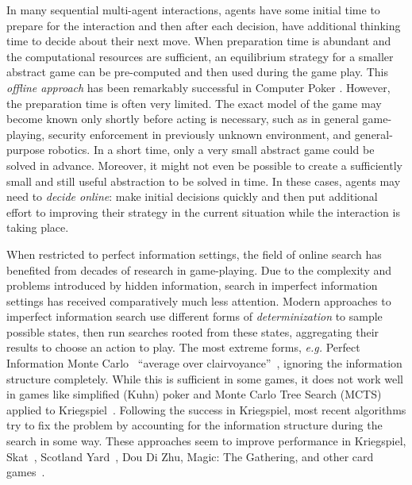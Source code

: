 \documentclass[letterpaper]{article}
\newcommand{\eg}{{\it e.g.}\xspace}
\begin{document}
In many sequential multi-agent interactions, agents have some initial time to prepare for the interaction and then after each decision, have  additional thinking time to decide about their next move. When preparation time is abundant and the computational resources are sufficient, an equilibrium strategy for a smaller abstract game can be pre-computed and then used during the game play. This {\it offline approach} has been remarkably successful in Computer Poker \cite{Johanson07Msc}.
However, the preparation time is often very limited. The exact model of the game may become known only shortly before acting is necessary, such as in general game-playing, security enforcement in previously unknown environment, and general-purpose robotics. In a short time, only a very small abstract game could be solved in advance. Moreover, it might not even be possible to create a sufficiently small and still useful abstraction to be solved in time. In these cases, agents may need to {\it decide online}: make initial decisions quickly and then put additional effort to improving their strategy in the current situation while the interaction is taking place.

When restricted to perfect information settings, the field of online search has benefited from decades of research in game-playing. 
Due to the complexity and problems introduced by hidden information, search in imperfect information settings has received comparatively much less attention.
Modern approaches to imperfect information search use different forms of {\it determinization} to sample possible states, then run 
searches rooted from these states, aggregating their results to choose an action to play. The most extreme forms, \eg Perfect Information 
Monte Carlo~\cite{Long10Understanding} ``average over clairvoyance''~\cite{AIBook},
ignoring the information structure completely. While this is sufficient in some games, it does not work well in games like simplified (Kuhn) poker and 
Monte Carlo Tree Search (MCTS) applied to Kriegspiel~\cite{Ciancarini10Kriegspiel}. 
Following the success in Kriegspiel, most recent algorithms try to fix the problem by accounting for the information structure during the 
search in some way. These approaches seem to improve performance in Kriegspiel, Skat~\cite{Furtak13Recursive}, 
Scotland Yard~\cite{Nijssen12SY}, Dou Di Zhu, Magic: The Gathering, and other card games~\cite{Cowling12MTG,Cowling12ISMCTS}.
\end{document}

